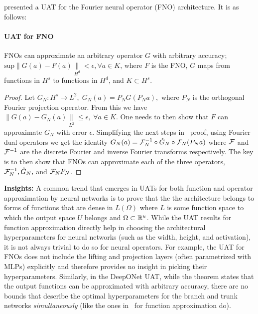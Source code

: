 \citep{kovachki2021universal} presented a UAT for the Fourier neural operator (FNO) architecture. It is as follows:
\paragraph{UAT for FNO}
\begin{theorem}
FNOs can approximate an arbitrary operator $G$ with arbitrary accuracy; $\text{sup} \|G(a) - F(a)\|\limits_{H^d} < \epsilon, \forall a \in K$, where $F$ is the FNO, $G$ maps from functions in $H^s$ to functions in $H^d$, and $K \subset H^s$.
\begin{proof}
Let $G_N: H^s \rightarrow L^2, \; G_N(a) = P_N G(P_N a),$ where $P_N$ is the orthogonal Fourier projection operator. From this we have $\|G(a) - G_N(a)\|\limits_{L^2} \le \epsilon, \; \forall a \in K$. One needs to then show that $F$ can approximate $G_N$ with error $\epsilon$. Simplifying the next steps in~\citep{kovachki2021universal} proof, using Fourier dual operators we get the identity $G_N(a) = \mathcal{F}_N^{-1} \circ \hat{G}_N \circ \mathcal{F}_N (P_N a)$ where $\mathcal{F}$ and $\mathcal{F}^{-1}$ are the discrete Fourier and inverse Fourier transforms respectively. The key is to then show that FNOs can approximate each of the three operators, $\mathcal{F}_N^{-1}, \hat{G}_N,$ and $\mathcal{F}_N P_N$.
\end{proof}
\end{theorem}
{\bf Insights:} A common trend that emerges in UATs for both function and operator approximation by neural networks is to prove that the the architecture belongs to forms of functions that are dense in $L(\Omega)$ where $L$ is some function space to which the output space $U$ belongs and $\Omega \subset \mathbb{R}^u$. While the UAT results for function approximation directly help in choosing the architectural hyperparameters for neural networks (such as the width, height, and activation), it is not always trivial to do so for neural operators. For example, the UAT for FNOs does not include the lifting and projection layers (often parametrized with MLPs) explicitly and therefore provides no insight in picking their hyperparameters. Similarly, in the DeepONet UAT, while the theorem states that the output functions can be approximated with arbitrary accuracy, there are no bounds that describe the optimal hyperparameters for the branch and trunk networks \emph{simultaneously} (like the ones in~\citep{lu2017expressive, park2020minimum} for function approximation do).

